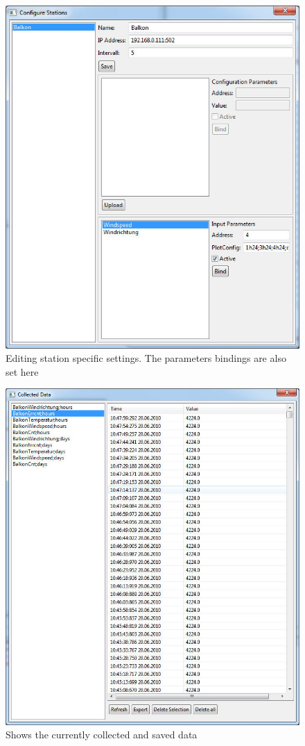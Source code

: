 \begin{figure}[p]
    \centering
    \includegraphics[width=0.8\linewidth]{master/stations.jpg}
    \caption{Editing station specific settings. The parameters bindings are also set here}
    \label{fig:stations}
\end{figure}

\begin{figure}[p]
    \centering
    \includegraphics[width=0.8\linewidth]{master/viewdata.jpg}
    \caption{Shows the currently collected and saved data}
    \label{fig:data}
\end{figure}
\newpage
